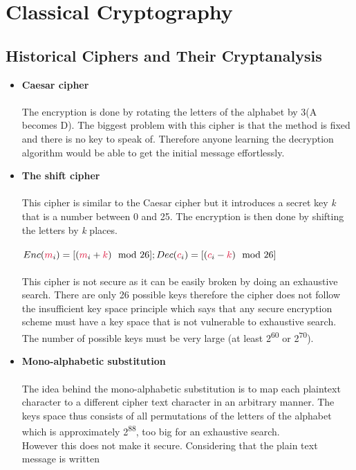 \chapter{Classical Cryptography}

\section{Historical Ciphers and Their Cryptanalysis}

\begin{itemize}
    \item \textbf{Caesar cipher}\\\\
The encryption is done by rotating the letters of the alphabet by 3(A becomes D). The biggest problem
with this cipher is that the method is fixed and there is no key to speak of. Therefore anyone
learning the decryption algorithm would be able to get the initial message effortlessly.
    \item \textbf{The shift cipher}\\\\
This cipher is similar to the Caesar cipher but it introduces a secret key \textit{k} that is a number
between 0 and 25. The encryption is then done by shifting the letters by \textit{k} places.\\\\
$Enc(\cm_{i}) = [(\cm_i+\ck) \mod 26];\\
Dec(\cc_{i}) = [(\cc_{i}-\ck) \mod 26]$\\\\
This cipher is not secure as it can be easily broken by doing an exhaustive search. There are
only 26 possible keys therefore the cipher does not follow the insufficient key space principle
which says that any secure encryption scheme must have a key space that is not vulnerable to
exhaustive search. The number of possible keys must be very large (at least 2\textsuperscript{60} or 2\textsuperscript{70}).
    \item \textbf{Mono-alphabetic substitution}\\\\
The idea behind the mono-alphabetic substitution is to map each plaintext character to a
different cipher text character in an arbitrary manner. The keys space thus consists of all
permutations of the letters of the alphabet which is approximately 2\textsuperscript{88}, too big for an exhaustive search.\\
However this does not make it secure. Considering that the plain text message is written

\end{itemize}
